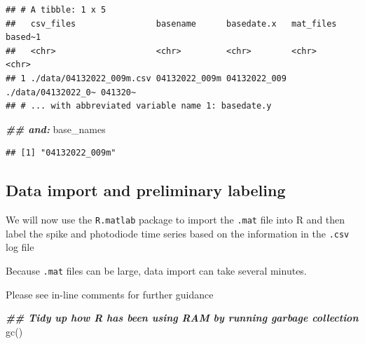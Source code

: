 \documentclass[
]{book}
\newenvironment{Shaded}{\begin{snugshade}}{\end{snugshade}}
\newcommand{\DocumentationTok}[1]{\textcolor[rgb]{0.56,0.35,0.01}{\textbf{\textit{#1}}}}
\newcommand{\FunctionTok}[1]{\textcolor[rgb]{0.00,0.00,0.00}{#1}}
\newcommand{\NormalTok}[1]{#1}
\newcommand{\OtherTok}[1]{\textcolor[rgb]{0.56,0.35,0.01}{#1}}
\newcommand{\SpecialCharTok}[1]{\textcolor[rgb]{0.00,0.00,0.00}{#1}}
\begin{document}
\begin{Shaded}
\end{Shaded}

\begin{verbatim}
## # A tibble: 1 x 5
##   csv_files                basename      basedate.x   mat_files          based~1
##   <chr>                    <chr>         <chr>        <chr>              <chr>  
## 1 ./data/04132022_009m.csv 04132022_009m 04132022_009 ./data/04132022_0~ 041320~
## # ... with abbreviated variable name 1: basedate.y
\end{verbatim}

\begin{Shaded}
\begin{Highlighting}[]
\DocumentationTok{\#\# and:}
\NormalTok{base\_names}
\end{Highlighting}
\end{Shaded}

\begin{verbatim}
## [1] "04132022_009m"
\end{verbatim}

\hypertarget{data-import-and-preliminary-labeling}{%
\subsection{Data import and preliminary labeling}\label{data-import-and-preliminary-labeling}}

We will now use the \texttt{R.matlab} package to import the \texttt{.mat} file into R and then
label the spike and photodiode time series based on the information in the
\texttt{.csv} log file

Because \texttt{.mat} files can be large, data import can take several minutes.

Please see in-line comments for further guidance

\begin{Shaded}
\begin{Highlighting}[]
\DocumentationTok{\#\# Tidy up how R has been using RAM by running garbage collection}
\FunctionTok{gc}\NormalTok{()}
\end{Highlighting}
\end{Shaded}
\end{document}
